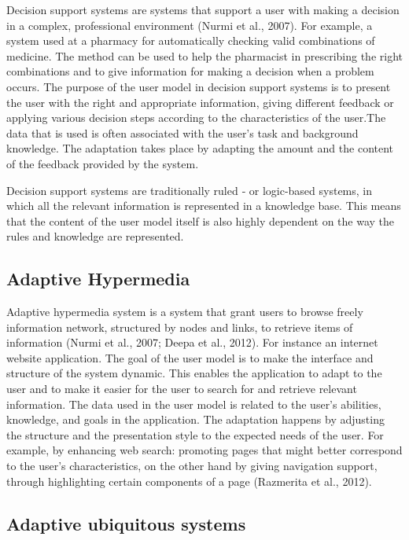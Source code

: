 Decision support systems are systems that support a user with making a decision
in a complex, professional environment (Nurmi et al., 2007). For example,  a
system used at a pharmacy for automatically checking valid combinations of
medicine. The method can be used to help the pharmacist in prescribing the right
combinations and to give information for making a decision when a problem
occurs.  The purpose of the user model in decision support systems is to present
the user with the right and appropriate information, giving different feedback
or applying various decision steps according to the characteristics of the
user.The data that is used is often associated with the user’s task and
background knowledge.    The adaptation takes place by adapting the amount and
the content of the feedback provided by the system.


Decision support systems are traditionally ruled ‐ or logic-based systems, in
which all the relevant information is represented in a knowledge base. This
means that the content of the user model itself is also highly dependent on the
way the rules and knowledge are represented.


\subsection{Adaptive Hypermedia}

Adaptive hypermedia system is a system that grant users to browse freely information
network,  structured by nodes and links, to retrieve items of information (Nurmi
et al., 2007; Deepa et al., 2012). For instance an internet website application.
The goal of the user model is to make the interface and structure of the system
dynamic. This enables the application to adapt to the user and to make it easier
for the user to search for and retrieve relevant information.  The data used in
the user model is related to the user’s abilities, knowledge, and goals in the
application. The adaptation happens by adjusting the structure and the
presentation style to the expected needs of the user. For example, by enhancing
web search: promoting pages that might better correspond to the user’s
characteristics, on the other hand by giving navigation support, through
highlighting certain components of a page (Razmerita et al., 2012).

\subsection{Adaptive ubiquitous systems}

